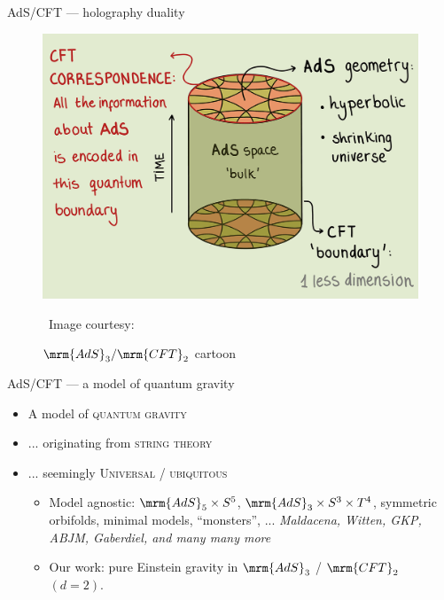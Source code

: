 \documentclass[
	10pt
	,handout
	,noamsthm
]{beamer}
\begin{document}
\begin{frame}{AdS/CFT --- holography duality}{%
	\citeMaldacena%
}
\vspace{-2.5\baselineskip}
\stateAdsCft
\vspace{-1.8\baselineskip}
\begin{figure}[!h]
	\centering
	\includegraphics[width=.5\linewidth]{img/ads-cft.png}

	\vspace{-.3\baselineskip}
	\caption{$\mrm{AdS}_3/\mrm{CFT}_2$ cartoon}
	
	\vspace*{-.8\baselineskip}
	\scriptsize\ Image courtesy: \textcite{AldegundePWSep22}
\end{figure}
\vspace{-1.3\baselineskip}
\end{frame}


\begin{frame}{AdS/CFT --- a model of quantum gravity}{%
	\citeMaldacena
}
\vspace{-2.4\baselineskip}
\stateAdsCft
\vspace{-1.6\baselineskip}
\pause
\begin{itemize}

\item A model of \textsc{quantum gravity}
\item ... originating from \textsc{string theory}
\item ... seemingly \textsc{Universal / ubiquitous}

\pause
\begin{itemize}
	\item Model agnostic: $\mrm{AdS}_5\times S^5$, $\mrm{AdS}_3\times S^3 \times T^4$, symmetric orbifolds, minimal models, ``monsters'', ... \textit{\small Maldacena, Witten, GKP, ABJM, Gaberdiel, and many many more}
	\item Our work: pure Einstein gravity in $\mrm{AdS}_3$ / $\mrm{CFT}_2$ $(d=2)$.
	
\end{itemize}
\end{itemize}
\end{frame}
\end{document}
